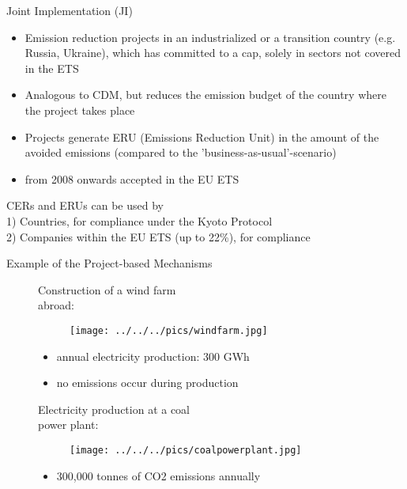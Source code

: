 
{Joint Implementation (JI)}
\begin{itemize}
\item <1-> Emission reduction projects in an industrialized or a transition country (e.g. Russia, Ukraine), which has committed to a cap, solely in sectors not covered in the ETS
\item <2-> Analogous to CDM, but reduces the emission budget of the country where the project takes place
\item <3-> Projects generate ERU (Emissions Reduction Unit) in the amount of the avoided emissions (compared to the 'business-as-usual'-scenario)
\item <4-> from 2008 onwards accepted in the EU ETS
\end{itemize}
CERs and ERUs can be used by \\
1) Countries, for compliance under the Kyoto Protocol \\
2) Companies within the EU ETS (up to 22\%), for compliance


{Example of the Project-based Mechanisms}
\begin{figure}[t]
\begin{minipage}[t]{0.475\textwidth}
Construction of a wind farm \\
abroad:
\vspace*{-0.2cm}
\begin{figure}[h!]
\centering
\texttt{[image: ../../../pics/windfarm.jpg]}
\end{figure}
\vspace*{-0.4cm}
\begin{itemize}
\item<1-> annual electricity production: 300 GWh
\item<1-> no emissions occur during production
\end{itemize}
\end{minipage}
\begin{minipage}[t]{0.475\textwidth}
Electricity production at a coal \\
power plant:
\vspace*{-0.2cm}
\begin{figure}[h!]
\centering
\texttt{[image: ../../../pics/coalpowerplant.jpg]}
\end{figure}
\vspace*{-0.4cm}
\begin{itemize}
\item<1-> 300,000 tonnes of CO2 emissions annually
\end{itemize}
\end{minipage}
\end{figure}


